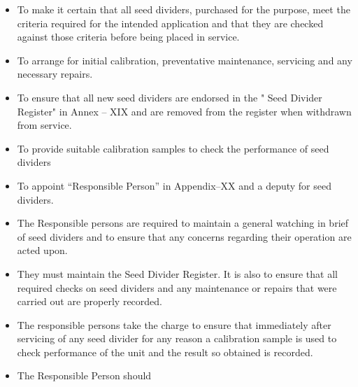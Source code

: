 \documentclass[]{book}
\providecommand{\tightlist}{%
  \setlength{\itemsep}{0pt}\setlength{\parskip}{0pt}}
\begin{document}
\begin{itemize}
\tightlist
\item
  To make it certain that all seed dividers, purchased for the purpose,
  meet the criteria required for the intended application and that they
  are checked against those criteria before being placed in service.
\item
  To arrange for initial calibration, preventative maintenance,
  servicing and any necessary repairs.
\item
  To ensure that all new seed dividers are endorsed in the " Seed
  Divider Register" in Annex -- XIX and are removed from the register
  when withdrawn from service.
\item
  To provide suitable calibration samples to check the performance of
  seed dividers
\item
  To appoint ``Responsible Person'' in Appendix--XX and a deputy for
  seed dividers.
\item
  The Responsible persons are required to maintain a general watching in
  brief of seed dividers and to ensure that any concerns regarding their
  operation are acted upon.
\item
  They must maintain the Seed Divider Register. It is also to ensure
  that all required checks on seed dividers and any maintenance or
  repairs that were carried out are properly recorded.
\item
  The responsible persons take the charge to ensure that immediately
  after servicing of any seed divider for any reason a calibration
  sample is used to check performance of the unit and the result so
  obtained is recorded.
\item
  The Responsible Person should


\end{itemize}
\end{document}
